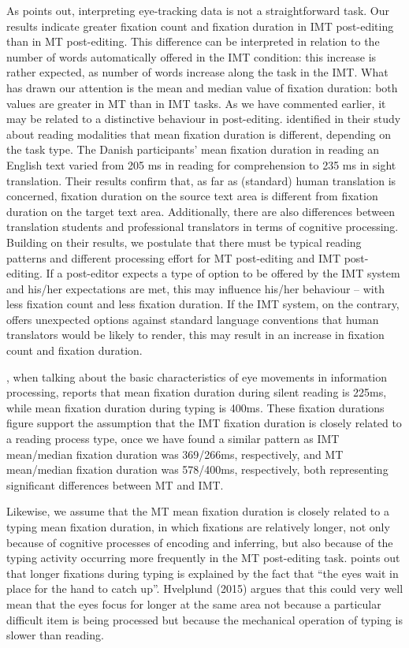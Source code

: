 \documentclass[output=paper]{langsci/langscibook}
\begin{document}
As \citet{obrien2008} points out, interpreting eye-tracking data is not a straightforward task. Our results indicate greater fixation count and fixation duration in IMT post-editing than in MT post-editing. This difference can be interpreted in relation to the number of words automatically offered in the IMT condition: this increase is rather expected, as number of words increase along the task in the IMT. What has drawn our attention is the mean and median value of fixation duration: both values are greater in MT than in IMT tasks. As we have commented earlier, it may be related to a distinctive behaviour in post-editing. \citet{jakobsen2008} identified in their study about reading modalities that mean fixation duration is different, depending on the task type. The Danish participants’ mean fixation duration in reading an English text varied from 205 ms in reading for comprehension to 235 ms in sight translation. Their results confirm that, as far as (standard) human translation is concerned, fixation duration on the source text area is different from fixation duration on the target text area. Additionally, there are also differences between translation students and professional translators in terms of cognitive processing. Building on their results, we postulate that there must be typical reading patterns and different processing effort for MT post-editing and IMT post-editing. If a post-editor expects a type of option to be offered by the IMT system and his/her expectations are met, this may influence his/her behaviour – with less fixation count and less fixation duration. If the IMT system, on the contrary, offers unexpected options against standard language conventions that human translators would be likely to render, this may result in an increase in fixation count and fixation duration.


\citet{rayner1998}, when talking about the basic characteristics of eye movements in information processing, reports that mean fixation duration during silent reading is 225ms, while mean fixation duration during typing is 400ms. These fixation durations figure support the assumption that the IMT fixation duration is closely related to a reading process type, once we have found a similar pattern as IMT mean/median fixation duration was 369/266ms, respectively, and MT mean/median fixation duration was 578/400ms, respectively, both representing significant differences between MT and IMT.



Likewise, we assume that the MT mean fixation duration is closely related to a typing mean fixation duration, in which fixations are relatively longer, not only because of cognitive processes of encoding and inferring, but also because of the typing activity occurring more frequently in the MT post-editing task. \citet[396]{rayner1998} points out that longer fixations during typing is explained by the fact that “the eyes wait in place for the hand to catch up”. Hvelplund (2015) argues that this could very well mean that the eyes focus for longer at the same area not because a particular difficult item is being processed but because the mechanical operation of typing is slower than reading.  
\end{document}
